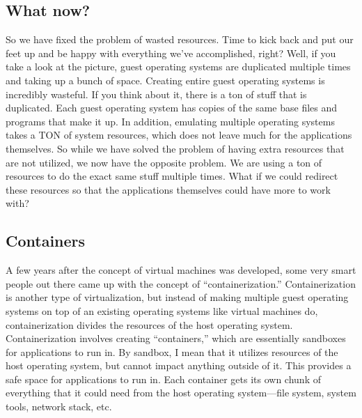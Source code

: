 \subsection{What now?}
So we have fixed the problem of wasted resources. Time to kick back and put our feet up and be happy with everything we’ve accomplished, right? Well, if you take a look at the picture, guest operating systems are duplicated multiple times and taking up a bunch of space. Creating entire guest operating systems is incredibly wasteful. If you think about it, there is a ton of stuff that is duplicated. Each guest operating system has copies of the same base files and programs that make it up. In addition, emulating multiple operating systems takes a TON of system resources, which does not leave much for the applications themselves. So while we have solved the problem of having extra resources that are not utilized, we now have the opposite problem. We are using a ton of resources to do the exact same stuff multiple times. What if we could redirect these resources so that the applications themselves could have more to work with?

\subsection{Containers}
A few years after the concept of virtual machines was developed, some very smart people out there came up with the concept of ``containerization.'' Containerization is another type of virtualization, but instead of making multiple guest operating systems on top of an existing operating systems like virtual machines do, containerization divides the resources of the host operating system. Containerization involves creating ``containers,'' which are essentially sandboxes for applications to run in. By sandbox, I mean that it utilizes resources of the host operating system, but cannot impact anything outside of it. This provides a safe space for applications to run in. Each container gets its own chunk of everything that it could need from the host operating system---file system, system tools, network stack, etc.

